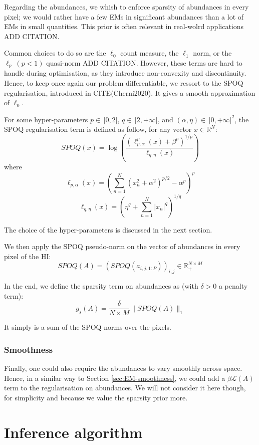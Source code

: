 \documentclass{article}
\begin{document}
Regarding the abundances, we whish to enforce sparsity of abundances in every pixel; we would rather have a few EMs in significant abundances than a lot of EMs in small quantities. This prior is often relevant in real-wolrd applications ADD CITATION.

Common choices to do so are the $\ell_0$ count measure, the $\ell_1$ norm, or the $\ell_p \ (p<1)$ quasi-norm ADD CITATION. However, these terms are hard to handle during optimisation, as they introduce non-convexity and discontinuity. Hence, to keep once again our problem differentiable, we ressort to the SPOQ regularisation, introduced in CITE(Cherni2020). It gives a smooth approximation of $\ell_0$.

For some hyper-parameters $p\in \, ]0, 2[$, $q\in \, [2, +\infty[$, and $(\alpha, \eta) \in \, ]0, +\infty [^2$, the SPOQ regularisation term is defined as follow, for any vector $x \in \mathbb{R}^N$:
$$SPOQ(x) = \log \left( \frac{(\ell_{p,\alpha}^p (x) + \beta^p)^{1/p}}{\ell_{q,\eta} (x)} \right)$$
        where
        $$\ell_{p,\alpha} (x) = \left( \sum_{n=1}^N (x_n^2 + \alpha^2)^{p/2} - \alpha^p \right)^p$$
        $$\ell_{q,\eta} (x) = \left( \eta^q + \sum_{n=1}^N |x_n|^q \right)^{1/q}$$

The choice of the hyper-parameters is discussed in the next section.

We then apply the SPOQ pseudo-norm on the vector of abundances in every pixel of the HI:
$$SPOQ(A) = (SPOQ(a_{i,j,1:P}))_{i, j} \in \mathbb{R}_+^{N \times M}$$

In the end, we define the sparsity term on abundances as (with $\delta > 0$ a penalty term):
\begin{equation}\label{eq:g_s}
  g_s(A) = \frac{\delta}{N \times M} \| SPOQ(A) \|_{1}
\end{equation}

It simply is a sum of the SPOQ norms over the pixels.

\subsubsection{Smoothness}
Finally, one could also require the abundances to vary smoothly across space. Hence, in a similar way to Section \ref{sec:EM-smoothness}, we could add a $\beta \mathcal{L}(A)$ term to the regularisation on abundances. We will not consider it here though, for simplicity and because we value the sparsity prior more.


\section{Inference algorithm}
\end{document}
